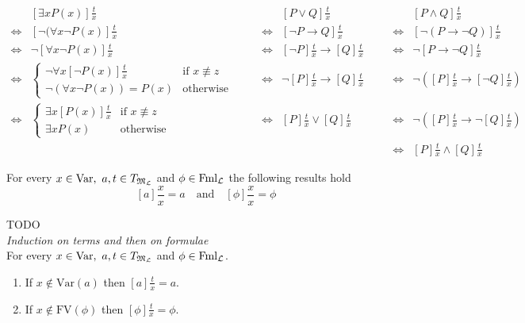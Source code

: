\documentclass[11pt,a4paper]{article}
\begin{document}
\[\begin{array}{rllrllrl}
&[\exists xP(x)]\frac{t}{x}&\quad&&[P\vee Q]\frac{t}{x}&\quad&&[P\wedge Q]\frac{t}{x}\\
\Leftrightarrow&[\neg(\forall x\neg P(x)]\frac{t}{x}&&\Leftrightarrow&[\neg P\to Q]\frac{t}{x}&&\Leftrightarrow&[\neg(P\to\neg Q)]\frac{t}{x}\\
\Leftrightarrow&\neg[\forall x\neg P(x)]\frac{t}{x}&&\Leftrightarrow&[\neg P]\frac{t}{x}\to[Q]\frac{t}{x}&&\Leftrightarrow&\neg[P\to\neg Q]\frac{t}{x}\\
\Leftrightarrow&\begin{cases}\neg\forall x[\neg P(x)]\frac{t}{x}&\text{if }x\not\equiv z\\\neg(\forall x\neg P(x))=P(x)&\text{otherwise}\end{cases}&&\Leftrightarrow&\neg[P]\frac{t}{x}\to[Q]\frac{t}{x}&&\Leftrightarrow&\neg\left([P]\frac{t}{x}\to[\neg Q]\frac{t}{x}\right)\\
\Leftrightarrow&\begin{cases}\exists x[P(x)]\frac{t}{x}&\text{if }x\not\equiv z\\\exists xP(x)&\text{otherwise}\end{cases}&&\Leftrightarrow&[P]\frac{t}{x}\vee[Q]\frac{t}{x}&&\Leftrightarrow&\neg\left([P]\frac{t}{x}\to\neg[Q]\frac{t}{x}\right)\\
&&&&&&\Leftrightarrow&[P]\frac{t}{x}\wedge[Q]\frac{t}{x}
\end{array}\]

\proposition{}
For every $x\in\text{Var},\ a,t\in T_{\mathfrak{M}_{\mathcal{L}}}$ and $\phi\in\text{Fml}_{\mathcal{L}}$ the following results hold
$$[a]\frac{x}{x}=a\quad\text{and}\quad[\phi]\frac{x}{x}=\phi$$

TODO\\
\textit{Induction on terms and then on formulae}\\

\proposition{}
For every $x\in\text{Var},\ a,t\in T_{\mathfrak{M}_{\mathcal{L}}}$ and $\phi\in\text{Fml}_{\mathcal{L}}$.
\begin{enumerate}
	\item If $x\not\in\text{Var}(a)$ then $[a]\frac{t}{x}=a$.
	\item If $x\not\in\text{FV}(\phi)$ then $[\phi]\frac{t}{x}=\phi$.
\end{enumerate}
\end{document}
